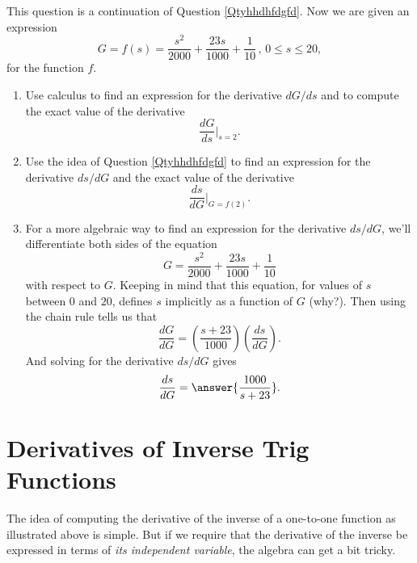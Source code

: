 \documentclass{ximera}
\begin{document}
\begin{question}  \label{Qttynmmbbb}
This question is a continuation of Question \ref{Qtyhhdhfdgfd}. Now we are given an expression
\[
   G = f(s)  = \frac{s^2}{2000} + \frac{23s}{1000} + \frac{1}{10} \, , \, 0\leq s\leq 20, 
\]
for the function $f$.

\begin{enumerate}
\item Use calculus to find an expression for the derivative $dG/ds$ and to compute the exact value of the derivative
\[
        \frac{dG}{ds}\Big|_{s=2} .
\]

\item Use the idea of Question \ref{Qtyhhdhfdgfd} to find an expression for the derivative $ds/dG$ and the exact value of the derivative
\[
   \frac{ds}{dG}\Big|_{G=f(2)} .
\]

\item For a more algebraic way to find an expression for the derivative $ds/dG$, we'll differentiate both sides of the equation
\[
    G =  \frac{s^2}{2000} + \frac{23s}{1000} + \frac{1}{10}
\]
with respect to $G$. Keeping in mind that this equation, for values of $s$ between $0$ and $20$, defines $s$ implicitly as a function of $G$ (why?). Then using the chain rule tells us that
\[
     \frac{dG}{dG} = \left( \frac{s+23}{1000} \right)  \left(\frac{ds}{dG} \right) .
\]
And solving for the derivative $ds/dG$ gives
\[
     \frac{ds}{dG} = \answer{\frac{1000}{s+23}} .
\]

\end{enumerate}
\end{question}




\section{Derivatives of Inverse Trig Functions}

The idea of computing the derivative of the inverse of a one-to-one function as illustrated above is simple. But if we require that the derivative of the inverse be expressed in terms of \emph{its independent variable}, the algebra can get a bit tricky.
\end{document}
